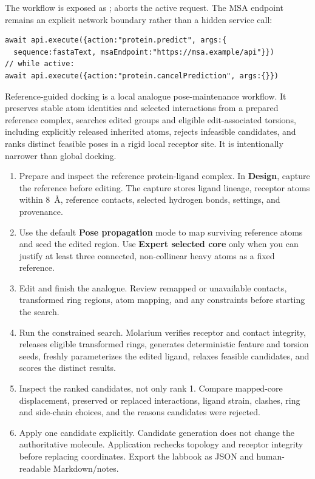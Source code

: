 \documentclass[11pt]{article}
\begin{document}
The workflow is exposed as ;  aborts the active request. The MSA endpoint remains an explicit network boundary rather than a hidden service call:

\begin{lstlisting}
await api.execute({action:"protein.predict", args:{
  sequence:fastaText, msaEndpoint:"https://msa.example/api"}})
// while active:
await api.execute({action:"protein.cancelPrediction", args:{}})
\end{lstlisting}


Reference-guided docking is a local analogue pose-maintenance workflow. It preserves stable atom identities and selected interactions from a prepared reference complex, searches edited groups and eligible edit-associated torsions, including explicitly released inherited atoms, rejects infeasible candidates, and ranks distinct feasible poses in a rigid local receptor site. It is intentionally narrower than global docking.


\begin{enumerate}
\item Prepare and inspect the reference protein-ligand complex. In \textbf{Design}, capture the reference before editing. The capture stores ligand lineage, receptor atoms within 8~\AA, reference contacts, selected hydrogen bonds, settings, and provenance.
\item Use the default \textbf{Pose propagation} mode to map surviving reference atoms and seed the edited region. Use \textbf{Expert selected core} only when you can justify at least three connected, non-collinear heavy atoms as a fixed reference.
\item Edit and finish the analogue. Review remapped or unavailable contacts, transformed ring regions, atom mapping, and any constraints before starting the search.
\item Run the constrained search. Molarium verifies receptor and contact integrity, releases eligible transformed rings, generates deterministic feature and torsion seeds, freshly parameterizes the edited ligand, relaxes feasible candidates, and scores the distinct results.
\item Inspect the ranked candidates, not only rank 1. Compare mapped-core displacement, preserved or replaced interactions, ligand strain, clashes, ring and side-chain choices, and the reasons candidates were rejected.
\item Apply one candidate explicitly. Candidate generation does not change the authoritative molecule. Application rechecks topology and receptor integrity before replacing coordinates. Export the labbook as JSON and human-readable Markdown/notes.
\end{enumerate}
\end{document}
